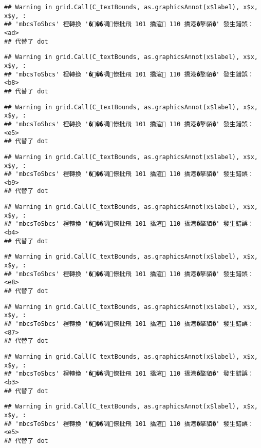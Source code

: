 \documentclass[
]{article}
\begin{document}
\begin{verbatim}
## Warning in grid.Call(C_textBounds, as.graphicsAnnot(x$label), x$x, x$y, :
## 'mbcsToSbcs' 裡轉換 '���啁憭批飛 101 撟渲 110 撟港�摮貊�' 發生錯誤：<ad>
## 代替了 dot
\end{verbatim}

\begin{verbatim}
## Warning in grid.Call(C_textBounds, as.graphicsAnnot(x$label), x$x, x$y, :
## 'mbcsToSbcs' 裡轉換 '���啁憭批飛 101 撟渲 110 撟港�摮貊�' 發生錯誤：<b8>
## 代替了 dot
\end{verbatim}

\begin{verbatim}
## Warning in grid.Call(C_textBounds, as.graphicsAnnot(x$label), x$x, x$y, :
## 'mbcsToSbcs' 裡轉換 '���啁憭批飛 101 撟渲 110 撟港�摮貊�' 發生錯誤：<e5>
## 代替了 dot
\end{verbatim}

\begin{verbatim}
## Warning in grid.Call(C_textBounds, as.graphicsAnnot(x$label), x$x, x$y, :
## 'mbcsToSbcs' 裡轉換 '���啁憭批飛 101 撟渲 110 撟港�摮貊�' 發生錯誤：<b9>
## 代替了 dot
\end{verbatim}

\begin{verbatim}
## Warning in grid.Call(C_textBounds, as.graphicsAnnot(x$label), x$x, x$y, :
## 'mbcsToSbcs' 裡轉換 '���啁憭批飛 101 撟渲 110 撟港�摮貊�' 發生錯誤：<b4>
## 代替了 dot
\end{verbatim}

\begin{verbatim}
## Warning in grid.Call(C_textBounds, as.graphicsAnnot(x$label), x$x, x$y, :
## 'mbcsToSbcs' 裡轉換 '���啁憭批飛 101 撟渲 110 撟港�摮貊�' 發生錯誤：<e8>
## 代替了 dot
\end{verbatim}

\begin{verbatim}
## Warning in grid.Call(C_textBounds, as.graphicsAnnot(x$label), x$x, x$y, :
## 'mbcsToSbcs' 裡轉換 '���啁憭批飛 101 撟渲 110 撟港�摮貊�' 發生錯誤：<87>
## 代替了 dot
\end{verbatim}

\begin{verbatim}
## Warning in grid.Call(C_textBounds, as.graphicsAnnot(x$label), x$x, x$y, :
## 'mbcsToSbcs' 裡轉換 '���啁憭批飛 101 撟渲 110 撟港�摮貊�' 發生錯誤：<b3>
## 代替了 dot
\end{verbatim}

\begin{verbatim}
## Warning in grid.Call(C_textBounds, as.graphicsAnnot(x$label), x$x, x$y, :
## 'mbcsToSbcs' 裡轉換 '���啁憭批飛 101 撟渲 110 撟港�摮貊�' 發生錯誤：<e5>
## 代替了 dot
\end{verbatim}
\end{document}
